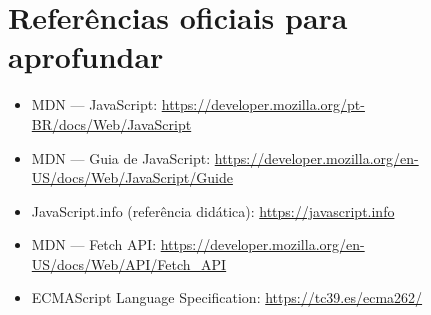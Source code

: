 \section{Referências oficiais para aprofundar}

\begin{itemize}[leftmargin=*, itemsep=0.3em]
  \item MDN — JavaScript: \url{https://developer.mozilla.org/pt-BR/docs/Web/JavaScript}
  \item MDN — Guia de JavaScript: \url{https://developer.mozilla.org/en-US/docs/Web/JavaScript/Guide}
  \item JavaScript.info (referência didática): \url{https://javascript.info}
  \item MDN — Fetch API: \url{https://developer.mozilla.org/en-US/docs/Web/API/Fetch_API}
  \item ECMAScript Language Specification: \url{https://tc39.es/ecma262/}
\end{itemize}
